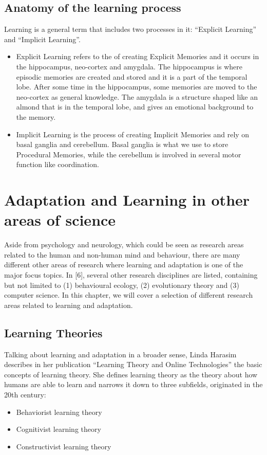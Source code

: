 \documentclass[conference]{IEEEtran}
\begin{document}
	\subsection{Anatomy of the learning process}\label{ALP}
		Learning is a general term that includes two processes in it: ``Explicit Learning'' and ``Implicit Learning''.
		\begin{itemize}
			\item Explicit Learning refers to the of creating Explicit Memories and it occurs in the hippocampus, neo-cortex and amygdala. \cite{b10} The hippocampus is where episodic memories are created and stored and it is a part of the temporal lobe. After some time in the hippocampus, some memories are moved to the neo-cortex as general knowledge. The amygdala is a structure shaped like an almond that is in the temporal lobe, and gives an emotional background to the memory.
			\item Implicit Learning is the process of creating Implicit Memories and rely on basal ganglia and cerebellum. \cite{b11} Basal ganglia is what we use to store Procedural Memories, while the cerebellum is involved in several motor function like coordination.
		\end{itemize}

\section{Adaptation and Learning in other areas of science}

	Aside from psychology and neurology, which could be seen as research areas related to the human and non-human mind and behaviour, there are many different other areas of research where learning and adaptation is one of the major focus topics. In [6], several other research disciplines are listed, containing but not limited to (1) behavioural ecology, (2) evolutionary theory and (3) computer science. In this chapter, we will cover a selection of different research areas related to learning and adaptation.

	\subsection{Learning Theories}\label{LT}
		Talking about learning and adaptation in a broader sense, Linda Harasim describes in her publication “Learning Theory and Online Technologies” \cite{d1} the basic concepts of learning theory. She defines learning theory as the theory about how humans are able to learn and narrows it down to three subfields, originated in the 20th century:
		\begin{itemize}
			\item Behaviorist learning theory
			\item Cognitivist learning theory
			\item Constructivist learning theory
		\end{itemize}
\end{document}
